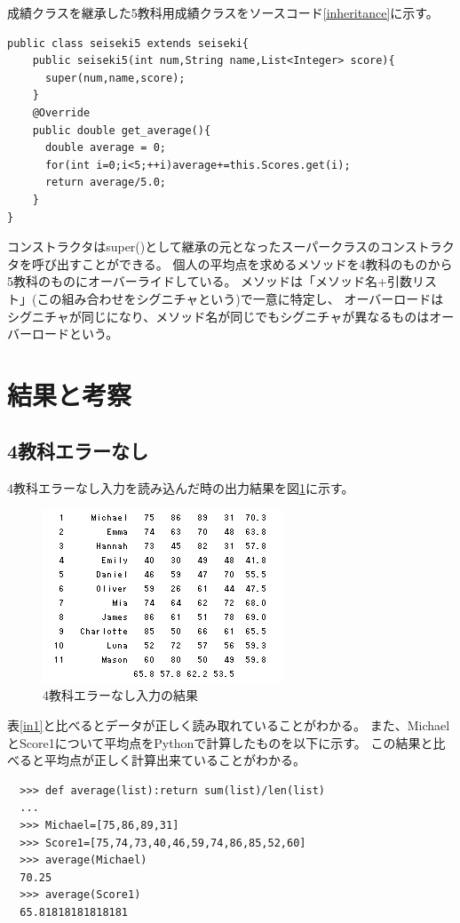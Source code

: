 \documentclass[dvipdfmx]{jsarticle}
\begin{document}
成績クラスを継承した5教科用成績クラスをソースコード\ref{inheritance}に示す。
\begin{lstlisting}[caption=成績クラスを継承したクラス,label=inheritance]
  public class seiseki5 extends seiseki{
    public seiseki5(int num,String name,List<Integer> score){
      super(num,name,score);
    }
    @Override
    public double get_average(){
      double average = 0;
      for(int i=0;i<5;++i)average+=this.Scores.get(i);
      return average/5.0;
    }
}
\end{lstlisting}

コンストラクタはsuper()として継承の元となったスーパークラスのコンストラクタを呼び出すことができる。
個人の平均点を求めるメソッドを4教科のものから5教科のものにオーバーライドしている。
メソッドは「メソッド名+引数リスト」(この組み合わせをシグニチャという)で一意に特定し、
オーバーロードはシグニチャが同じになり、メソッド名が同じでもシグニチャが異なるものはオーバーロードという。


\section{結果と考察}
\subsection{4教科エラーなし}
4教科エラーなし入力を読み込んだ時の出力結果を図\ref{res1}に示す。
\begin{figure}[H]
  \centering
  \includegraphics[width=0.6\hsize]{../pic/res1.png}
  \caption{4教科エラーなし入力の結果}
  \label{res1}
\end{figure}

表\ref{in1}と比べるとデータが正しく読み取れていることがわかる。
また、MichaelとScore1について平均点をPythonで計算したものを以下に示す。
この結果と比べると平均点が正しく計算出来ていることがわかる。
\begin{lstlisting}
  >>> def average(list):return sum(list)/len(list)
  ...
  >>> Michael=[75,86,89,31]
  >>> Score1=[75,74,73,40,46,59,74,86,85,52,60]
  >>> average(Michael)
  70.25
  >>> average(Score1)
  65.81818181818181
\end{lstlisting}
\end{document}
